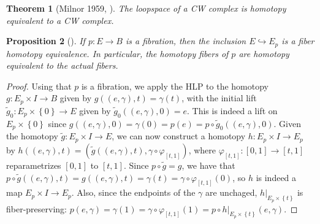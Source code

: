 \documentclass[reqno]{amsart}
\newtheorem{theorem}{Theorem}[section]
\newtheorem{proposition}[theorem]{Proposition}
\theoremstyle{definition}
\theoremstyle{remark}
\begin{document}
     \begin{theorem}[Milnor 1959, \cite{Hatcher}]
         The loopspace of a CW complex is homotopy equivalent
         to a CW complex.
     \end{theorem}





     \begin{proposition}[]
         If $p \colon E \to B$ is a fibration, then
         the inclusion $E \hookrightarrow E_p$ is a fiber
         homotopy equivalence. In particular, the
         homotopy fibers of $p$ are homotopy equivalent to
         the actual fibers.
     \end{proposition}

     \begin{proof}
         Using that $p$ is a fibration, we apply
         the HLP to the homotopy
         $g \colon E_p \times I \to B$ given by
         $g\left( \left( e, \gamma \right) ,t \right) 
         = \gamma(t)$, with the initial lift
         $\tilde{g}_0 \colon E_p \times \left\{ 0 \right\} 
         \to E$ given by
         $\tilde{g}_0 \left( (e,\gamma),0 \right) = 
         e$.
         This is indeed a lift
         on $E_p \times \left\{ 0 \right\} $ since
         $g ((e, \gamma),0) =
          \gamma(0) = p(e) = p \circ
          \tilde{g}_0 \left( \left( e, \gamma \right) ,0
          \right) $.
          Given the homotopy $\tilde{g} \colon E_p \times I \to E$,
          we can now construct a homotopy
          $h \colon E_p \times I \to E_p$ by
          $h\left( (e, \gamma), t \right) 
          = \left( \tilde{g}\left( (e, \gamma), t \right) ,
          \gamma \circ \varphi_{\left[ t,1 \right] } \right) $, where
          $\varphi_{\left[ t,1 \right] } \colon
          \left[ 0,1 \right] \to \left[ t,1 \right] $ reparametrizes
          $\left[ 0,1 \right] $ to $\left[ t,1 \right] $.
          Since $p \circ \tilde{g} = g$, we have
          that
          $p \circ \tilde{g}\left( (e,\gamma), t \right) 
          = g\left( (e,\gamma),t \right) 
          = \gamma(t) = \gamma \circ \varphi_{\left[ t,1 \right] }
          (0)$, so $h$ is indeed a map
          $E_p \times I \to E_p$.
          Also, since the endpoints of the
          $\gamma$ are unchaged, $h|_{E_p \times \left\{ t \right\} 
          }$ is fiber-preserving:
          $ p \left( e, \gamma \right) = \gamma(1)
          = \gamma \circ \varphi_{\left[ t,1 \right] }(1)
          = p \circ 
          h|_{E_p \times \left\{ t \right\} }
          \left( e, \gamma \right) $.


\end{proof}
\end{document}
